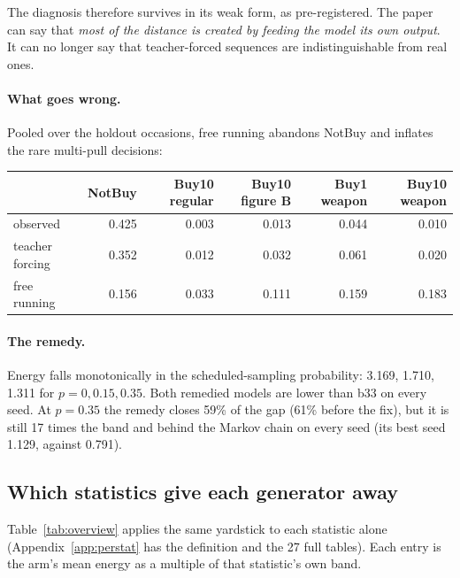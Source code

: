 \documentclass[11pt]{article}
\begin{document}
\noindent The diagnosis therefore survives in its weak form, as pre-registered.
The paper can say that \emph{most of the distance is created by feeding the
model its own output}. It can no longer say that teacher-forced sequences are
indistinguishable from real ones.

\paragraph{What goes wrong.} Pooled over the holdout occasions, free running
abandons NotBuy and inflates the rare multi-pull decisions:

\begin{center}
\small
\begin{tabular}{@{}lrrrrr@{}}
\toprule
 & NotBuy & Buy10 regular & Buy10 figure B & Buy1 weapon & Buy10 weapon \\
\midrule
observed & 0.425 & 0.003 & 0.013 & 0.044 & 0.010 \\
teacher forcing & 0.352 & 0.012 & 0.032 & 0.061 & 0.020 \\
free running & 0.156 & 0.033 & 0.111 & 0.159 & 0.183 \\
\bottomrule
\end{tabular}
\end{center}

\paragraph{The remedy.} Energy falls monotonically in the scheduled-sampling
probability: 3.169, 1.710, 1.311 for $p = 0, 0.15, 0.35$. Both remedied models
are lower than b33 on every seed. At $p = 0.35$ the remedy closes 59\% of the
gap (61\% before the fix), but it is still 17 times the band and behind the
Markov chain on every seed (its best seed 1.129, against 0.791).

\subsection{Which statistics give each generator away}\label{sec:perstat}

Table~\ref{tab:overview} applies the same yardstick to each statistic alone
(Appendix~\ref{app:perstat} has the definition and the 27 full tables). Each
entry is the arm's mean energy as a multiple of that statistic's own band.

\begin{table}[h]
\centering
\small
\caption{Energy by statistic, in multiples of each statistic's real-vs-real
band (R36i, mean over three runs). Grey: inside the band on every run. Bottom
row: statistics outside the band on every run.}
\label{tab:overview}
\end{table}
\end{document}
